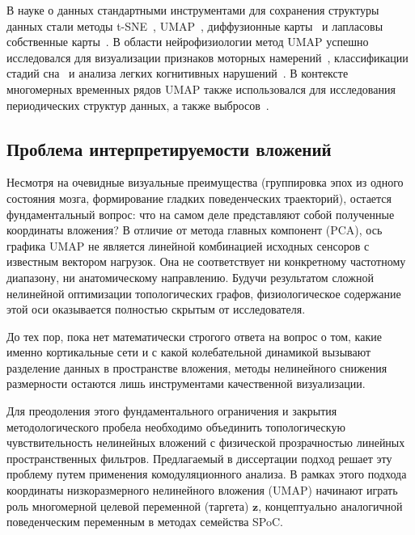 В науке о данных стандартными инструментами для сохранения структуры данных стали методы t-SNE~\cite{maaten2008tsne}, UMAP~\cite{mcinnes2018umap}, диффузионные карты~\cite{coifman2006diffusion} и лапласовы собственные карты~\cite{belkin2003laplacian}. В области нейрофизиологии метод UMAP успешно исследовался для визуализации признаков моторных намерений~\cite{Du2023UMAP_BCI}, классификации стадий сна~\cite{Deng2024UMAP_Sleep} и анализа легких когнитивных нарушений~\cite{Rutkowski2024MCI, Rutkowski2023Dementia}. В контексте многомерных временных рядов UMAP также использовался для исследования периодических структур данных, а также выбросов~\cite{ali2019timecluster}.

\subsection{Проблема интерпретируемости вложений}
\label{sec:interpretability_problem}

Несмотря на очевидные визуальные преимущества (группировка эпох из одного состояния мозга, формирование гладких поведенческих траекторий), остается фундаментальный вопрос: что на самом деле представляют собой полученные координаты вложения? В отличие от метода главных компонент (PCA), ось графика UMAP не является линейной комбинацией исходных сенсоров с известным вектором нагрузок. Она не соответствует ни конкретному частотному диапазону, ни анатомическому направлению. Будучи результатом сложной нелинейной оптимизации топологических графов, физиологическое содержание этой оси оказывается полностью скрытым от исследователя.

До тех пор, пока нет математически строгого ответа на вопрос о том, какие именно кортикальные сети и с какой колебательной динамикой вызывают разделение данных в пространстве вложения, методы нелинейного снижения размерности остаются лишь инструментами качественной визуализации.

Для преодоления этого фундаментального ограничения и закрытия методологического пробела необходимо объединить топологическую чувствительность нелинейных вложений с физической прозрачностью линейных пространственных фильтров. Предлагаемый в диссертации подход решает эту проблему путем применения комодуляционного анализа. В рамках этого подхода координаты низкоразмерного нелинейного вложения (UMAP) начинают играть роль многомерной целевой переменной (таргета) $\mathbf{z}$, концептуально аналогичной поведенческим переменным в методах семейства SPoC.

